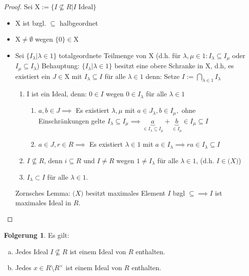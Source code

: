 \documentclass[a4paper, titlepage]{article}
\theoremstyle{definition}
\newtheorem*{fg}{Folgerung}
\begin{document}
\begin{proof}
    Sei $\mathrm{X}:=\{I\not\subseteq R| I \text{ Ideal}\}$
    \begin{itemize}
        \item $\mathrm{X}$ ist bzgl. $\subseteq$ halbgeordnet
        \item $\mathrm{X}\neq\emptyset$ wegen $\{0\}\in \mathrm{X}$
        \item Sei $\{I_\lambda|\lambda \in 1 \}$ totalgeordnete Teilmenge von $\mathrm{X}$ (d.h. für $\lambda,\mu \in 1:I_\lambda \subseteq I_\mu$ oder $I_\mu\subseteq I_\lambda$)
            Behauptung: $\{I_\lambda|\lambda\in 1\}$ besitzt eine obere Schranke in $\mathrm{X}$, d.h, es existiert ein $J\in \mathrm{X}$ mit $I_\lambda\subseteq I$ für alle $\lambda\in 1$
            denn: Setze $I:=\bigcap\limits_{\lambda\in 1}I_\lambda$
            \begin{enumerate}
                \item I ist ein Ideal, denn: $0\in I$ wegen $0\in I_\lambda$ für alle $\lambda\in 1$
                \begin{enumerate}[(J2)]
                    \item $a,b\in J \implies $ Es existiert $\lambda, \mu$  mit $a\in J_\lambda, b\in I_\mu,$ ohne Einschränkungen gelte $I_\lambda \subseteq I_\mu\implies \underbrace{a}_{\in I_\lambda\subseteq I_\mu}+\underbrace{b}_{\in I_\mu}\in I_\mu\subseteq I$ 
                    \item $a\in J, r\in R\implies $ Es existiert $\lambda\in 1$ mit $a\in I_\lambda \implies ra\in I_\lambda\subseteq I$
                \end{enumerate}
        \item $I\not\subseteq R$, denn $i\subseteq R$ und  $I\neq R$ wegen $1\neq I_\lambda$ für alle $\lambda\in 1$, (d.h. $I\in \mathrm(X)$)
        \item $I_\lambda\subset I$ für alle $\lambda\in 1$.
            \end{enumerate}
    Zornsches Lemma: $\mathrm(X)$ besitzt maximales Element $I$ bzgl $\subseteq \implies I$ ist maximales Ideal in $R$.
    \end{itemize}
\end{proof}
\begin{fg}
    Es gilt:
    \begin{enumerate}[(a)]
        \item Jedes Ideal $I\not\subseteq R$ ist einem Ideal von $R$ enthalten.
        \item Jedes $x\in R\setminus R^{\times} $ ist einem Ideal von $R$ enthalten.
    \end{enumerate}
\end{fg}
\end{document}

